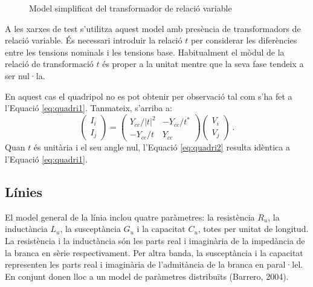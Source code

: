 \begin{figure}[!ht] \footnotesize
    \begin{center}
    \caption{Model simplificat del transformador de relació variable}
    \label{fig:trafo3}
    \end{center}
    \end{figure}

A les xarxes de test s'utilitza aquest model amb presència de transformadors de relació variable. És necessari introduir la relació $t$ per considerar les diferències entre les tensions nominals i les tensions base. Habitualment el mòdul de la relació de transformació $t$ és proper a la unitat mentre que la seva fase tendeix a ser nul·la.

En aquest cas el quadripol no es pot obtenir per observació tal com s'ha fet a l'Equació \ref{eq:quadri1}. Tanmateix, s'arriba a:
\begin{equation}
    \begin{pmatrix}
        I_i \\
        I_j 
    \end{pmatrix}
    =
    \begin{pmatrix}
        Y_{cc}/|t|^2 & -Y_{cc}/t^* \\
        -Y_{cc}/t & Y_{cc} 
    \end{pmatrix}
    \begin{pmatrix}
        V_i \\
        V_j
    \end{pmatrix}\ .
    \label{eq:quadri2}
\end{equation}
Quan $t$ és unitària i el seu angle nul, l'Equació \ref{eq:quadri2} resulta idèntica a l'Equació \ref{eq:quadri1}.

\subsection{Línies}
El model general de la línia inclou quatre paràmetres: la resistència $R_u$, la inductància $L_u$, la susceptància $G_u$ i la capacitat $C_u$, totes per unitat de longitud. La resistència i la inductància són les parts real i imaginària de la impedància de la branca en sèrie respectivament. Per altra banda, la susceptància i la capacitat representen les parts real i imaginària de l'admitància de la branca en paral·lel. En conjunt donen lloc a un model de paràmetres distribuïts (Barrero, 2004).

